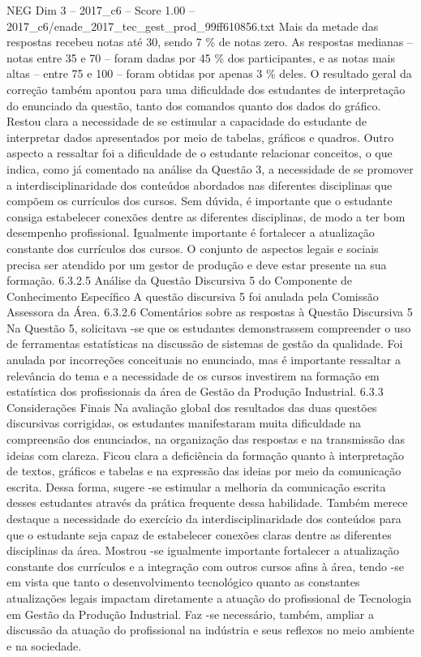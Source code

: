 \begin{textsample}{NEG Dim 3 – 2017\_c6 – Score 1.00 – 2017\_c6/enade\_2017\_tec\_gest\_prod\_99ff610856.txt}
Mais da metade das respostas recebeu notas até 30, sendo 7 \% de notas zero.
As respostas medianas – notas entre 35 e 70 – foram dadas por 45 \% dos participantes, e as notas mais altas – entre 75 e 100 – foram obtidas por apenas 3 \% deles.
O resultado geral da correção também apontou para uma dificuldade dos estudantes de interpretação do enunciado da questão, tanto dos comandos quanto dos dados do gráfico.
Restou clara a necessidade de se estimular a capacidade do estudante de interpretar dados apresentados por meio de tabelas, gráficos e quadros.
Outro aspecto a ressaltar foi a dificuldade de o estudante relacionar conceitos, o que indica, como já comentado na análise da Questão 3, a necessidade de se promover a interdisciplinaridade dos conteúdos abordados nas diferentes disciplinas que compõem os currículos dos cursos.
Sem dúvida, é importante que o estudante consiga estabelecer conexões dentre as diferentes disciplinas, de modo a ter bom desempenho profissional.
Igualmente importante é fortalecer a atualização constante dos currículos dos cursos.
O conjunto de aspectos legais e sociais precisa ser atendido por um gestor de produção e deve estar presente na sua formação. 6.3.2.5 Análise da Questão Discursiva 5 do Componente de Conhecimento Específico A questão discursiva 5 foi anulada pela Comissão Assessora da Área. 6.3.2.6 Comentários sobre as respostas à Questão Discursiva 5 Na Questão 5, solicitava -se que os estudantes demonstrassem compreender o uso de ferramentas estatísticas na discussão de sistemas de gestão da qualidade.
Foi anulada por incorreções conceituais no enunciado, mas é importante ressaltar a relevância do tema e a necessidade de os cursos investirem na formação em estatística dos profissionais da área de Gestão da Produção Industrial. 6.3.3 Considerações Finais Na avaliação global dos resultados das duas questões discursivas corrigidas, os estudantes manifestaram muita dificuldade na compreensão dos enunciados, na organização das respostas e na transmissão das ideias com clareza.
Ficou clara a deficiência da formação quanto à interpretação de textos, gráficos e tabelas e na expressão das ideias por meio da comunicação escrita.
Dessa forma, sugere -se estimular a melhoria da comunicação escrita desses estudantes através da prática frequente dessa habilidade.
Também merece destaque a necessidade do exercício da interdisciplinaridade dos conteúdos para que o estudante seja capaz de estabelecer conexões claras dentre as diferentes disciplinas da área.
Mostrou -se igualmente importante fortalecer a atualização constante dos currículos e a integração com outros cursos afins à área, tendo -se em vista que tanto o desenvolvimento tecnológico quanto as constantes atualizações legais impactam diretamente a atuação do profissional de Tecnologia em Gestão da Produção Industrial.
Faz -se necessário, também, ampliar a discussão da atuação do profissional na indústria e seus reflexos no meio ambiente e na sociedade.

\end{textsample}
